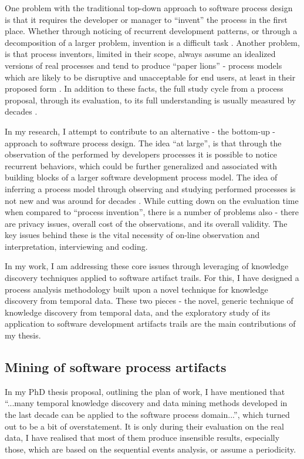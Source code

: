 \documentclass[11pt,oneside]{article}
\numberwithin{equation}{subsection}
\begin{document}
One problem with the  traditional top-down approach to software process design is that it 
requires the developer or manager to ``invent'' the process in the first place. Whether
through noticing of recurrent development patterns, or through a decomposition of a larger 
problem, invention is a difficult task \cite{citeulike:5043104}. 
Another problem, is that process inventors, limited in their scope, 
always assume an idealized versions of real processes and tend to produce ``paper lions'' - 
process models which are likely to be disruptive and  unacceptable for end users, at least 
in their proposed form \cite{citeulike:9758924}. In addition to these facts, the full study 
cycle from a process proposal, through its evaluation, to its full understanding is 
usually measured by decades \cite{citeulike:113403}.

In my research, I attempt to contribute to an alternative - the bottom-up - approach to software
process design. The idea ``at large'', is that through the observation of the performed 
by developers processes it is possible to notice recurrent behaviors, which could be
further generalized and associated with building blocks of a larger software development process
model. The idea of inferring a process model through observing and studying performed processes is
not new and was around for decades \cite{citeulike:328044}. While cutting down on the
evaluation time when compared to ``process invention'', there is a number of problems also - there
are privacy issues, overall cost of the observations, and its overall validity. The key issues
behind these is the vital necessity of on-line observation and interpretation, interviewing and
coding.

In my work, I am addressing these core issues through leveraging of knowledge discovery techniques
applied to software artifact trails. For this, I have designed a process analysis 
methodology built upon a novel technique for knowledge discovery from temporal data. 
These two pieces - the novel, generic technique of knowledge discovery from temporal data,
and the exploratory study of its application to software development artifacts trails 
are the main contributions of my thesis.

\subsection{Mining of software process artifacts}
In my PhD thesis proposal, outlining the plan of work, I have mentioned that ``...many temporal
knowledge discovery and data mining methods developed in the last decade can be applied to the
software process domain...'', which turned out to be a bit of overstatement. It is only during 
their evaluation on the real data, I have realised that most of them produce insensible results,
especially those, which are based on the sequential events analysis, or assume a periodicity.
\end{document}
